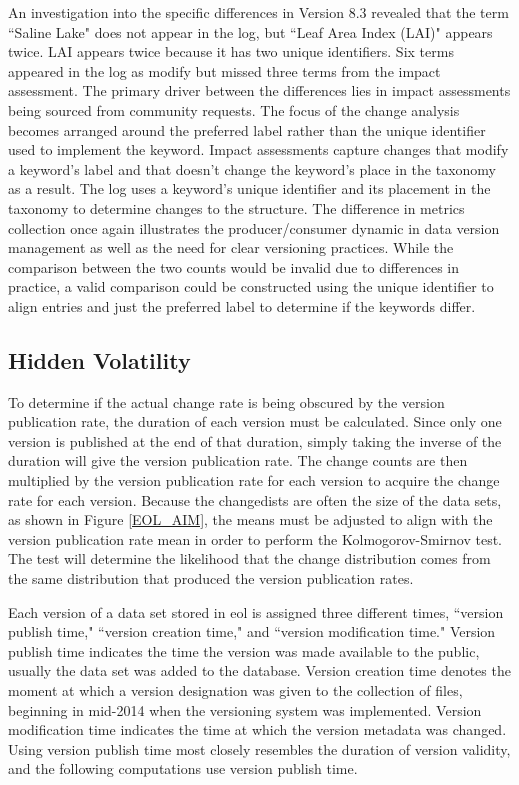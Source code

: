 An investigation into the specific differences in Version 8.3 revealed that the term ``Saline Lake" does not appear in the \gls{log}, but ``Leaf Area Index (LAI)" appears twice.
LAI appears twice because it has two unique identifiers.
Six terms appeared in the \gls{log} as \gls{modify} but missed three terms from the impact assessment.
The primary driver between the differences lies in impact assessments being sourced from community requests.
The focus of the change analysis becomes arranged around the preferred label rather than the unique identifier used to implement the keyword.
Impact assessments capture changes that modify a keyword's label and that doesn't change the keyword's place in the taxonomy as a result.
The \gls{log} uses a keyword's unique identifier and its placement in the taxonomy to determine changes to the structure.
The difference in metrics collection once again illustrates the producer/consumer dynamic in data version management as well as the need for clear versioning practices.
While the comparison between the two counts would be invalid due to differences in practice, a valid comparison could be constructed using the unique identifier to align entries and just the preferred label to determine if the keywords differ.

\subsection{Hidden Volatility}

To determine if the actual change rate is being obscured by the version publication rate, the duration of each \gls{version} must be calculated.
Since only one \gls{version} is published at the end of that duration, simply taking the inverse of the duration will give the version publication rate.
The change counts are then multiplied by the version publication rate for each \gls{version} to acquire the change rate for each \gls{version}.
Because the \glspl{changedist} are often the size of the data sets, as shown in Figure \ref{EOL_AIM}, the means must be adjusted to align with the version publication rate mean in order to perform the Kolmogorov-Smirnov test.
The test will determine the likelihood that the change distribution comes from the same distribution that produced the version publication rates.

Each \gls{version} of a data set stored in \gls{eol} is assigned three different times, ``version publish time," ``version creation time," and ``version modification time." 
Version publish time indicates the time the \gls{version} was made available to the public, usually the data set was added to the database.  
Version creation time denotes the moment at which a \gls{version} designation was given to the collection of files, beginning in mid-2014 when the versioning system was implemented.  
Version modification time indicates the time at which the \gls{version} metadata was changed.  
Using version publish time most closely resembles the duration of version validity, and the following computations use version publish time.

